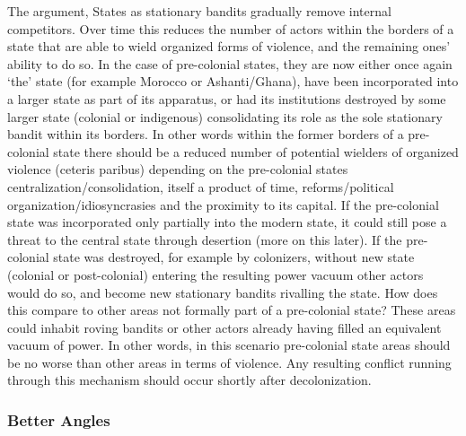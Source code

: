 \documentclass[12pt]{article}
\begin{document}
The \citet{Tilly1990} argument, 
States as stationary bandits gradually remove internal
competitors. Over time this reduces the number of actors within the borders of a
state that are able to wield organized forms of violence, and the remaining
ones' ability to do so. In the case of pre-colonial states, they are now either
once again `the' state (for example Morocco or Ashanti/Ghana), have been
incorporated into a larger state as part of its apparatus, or had its
institutions destroyed by some larger state (colonial or indigenous)
consolidating its role as the sole stationary bandit within its borders. In
other words within the former borders of a pre-colonial state there should be a
reduced number of potential wielders of organized violence (ceteris paribus)
depending on the pre-colonial states centralization/consolidation, itself a
product of time, reforms/political organization/idiosyncrasies and the proximity
to its capital. If the pre-colonial state was incorporated only partially into
the modern state, it could still pose a threat to the central state through
desertion (more on this later). If the pre-colonial state was destroyed, for
example by colonizers, without new state (colonial or post-colonial) entering
the resulting power vacuum other actors would do so, and become new stationary
bandits rivalling the state. How does this compare to other areas not formally
part of a pre-colonial state? These areas could inhabit roving bandits
\citep{Scott2009} or other actors already having filled an equivalent vacuum of
power. In other words, in this scenario pre-colonial state areas should be no
worse than other areas in terms of violence. Any resulting conflict running
through this mechanism should occur shortly after decolonization.

\subsubsection{Better Angles}
\end{document}
